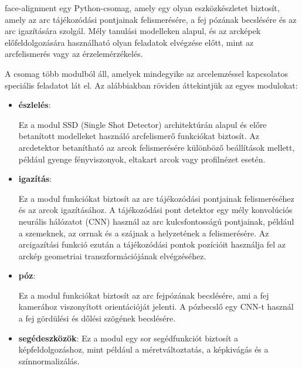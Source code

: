 \documentclass[12pt,a4]{article}
\begin{document}
     face-alignment egy Python-csomag, amely egy olyan eszközkészletet biztosít, amely az arc tájékozódási pontjainak felismerésére, a fej pózának becslésére és az arc igazítására szolgál. 
     Mély tanulási modelleken alapul, és az arcképek előfeldolgozására használható olyan feladatok elvégzése előtt, mint az arcfelismerés vagy az érzelemérzékelés.
    
    A csomag több modulból áll, amelyek mindegyike az arcelemzéssel kapcsolatos speciális feladatot lát el. Az alábbiakban röviden áttekintjük az egyes modulokat:

    \begin{itemize}
        \item \textbf{észlelés}: 
        
        Ez a modul SSD (Single Shot Detector) architektúrán alapul és előre betanított modelleket használó arcfelismerő funkciókat biztosít. Az arcdetektor betanítható az arcok felismerésére különböző beállítások mellett, például gyenge fényviszonyok, eltakart arcok vagy profilnézet esetén.

        \item \textbf{igazítás}: 
        
        Ez a modul funkciókat biztosít az arc tájékozódási pontjainak felismeréséhez és az arcok igazításához.
		A tájékozódási pont detektor egy mély konvolúciós neurális hálózatot (CNN) használ az arc kulcsfontosságú pontjainak, például a szemeknek, az orrnak és a szájnak a helyzetének a felismerésére. 
		Az arcigazítási funkció ezután a tájékozódási pontok pozícióit használja fel az arckép geometriai transzformációjának elvégzéséhez.


        \item \textbf{póz}: 
        
        Ez a modul funkciókat biztosít az arc fejpózának becslésére, ami a fej kamerához viszonyított orientációját jelenti. A pózbecslő egy CNN-t használ a fej gördülési és dőlési szögének becslésére.
        \item \textbf{segédeszközök}: Ez a modul egy sor segédfunkciót biztosít a képfeldolgozáshoz, mint például a méretváltoztatás, a képkivágás és a színnormalizálás.

    \end{itemize}

   
\end{document}
